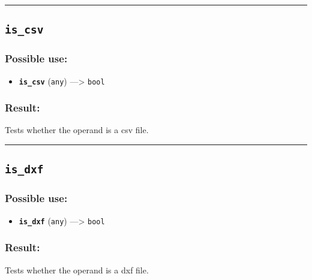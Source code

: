 \documentclass[]{book}
\providecommand{\tightlist}{%
  \setlength{\itemsep}{0pt}\setlength{\parskip}{0pt}}
\theoremstyle{definition}
\theoremstyle{definition}
\theoremstyle{definition}
\theoremstyle{remark}
\begin{document}
\begin{center}\rule{0.5\linewidth}{\linethickness}\end{center}

\subsection{\texorpdfstring{\texttt{is\_csv}}{is\_csv}}\label{is_csv}

\subsubsection{Possible use:}\label{possible-use-285}

\begin{itemize}
\tightlist
\item
  \textbf{\texttt{is\_csv}} (\texttt{any}) ---\textgreater{}
  \texttt{bool}
\end{itemize}

\subsubsection{Result:}\label{result-275}

Tests whether the operand is a csv file.

\begin{center}\rule{0.5\linewidth}{\linethickness}\end{center}

\subsection{\texorpdfstring{\texttt{is\_dxf}}{is\_dxf}}\label{is_dxf}

\subsubsection{Possible use:}\label{possible-use-286}

\begin{itemize}
\tightlist
\item
  \textbf{\texttt{is\_dxf}} (\texttt{any}) ---\textgreater{}
  \texttt{bool}
\end{itemize}

\subsubsection{Result:}\label{result-276}

Tests whether the operand is a dxf file.
\end{document}
